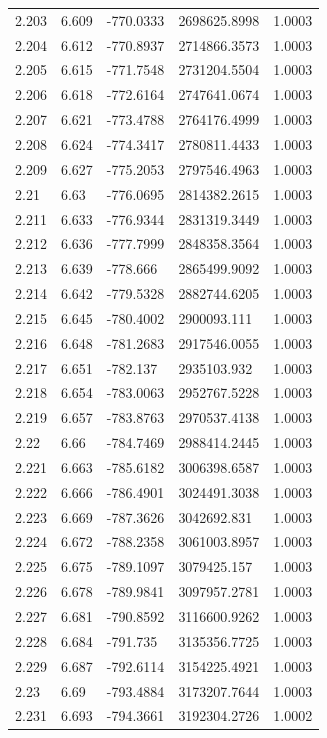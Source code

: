 \begin{tabular}{lllll}
2.203 & 6.609 & -770.0333 & 2698625.8998 & 1.0003 \\
2.204 & 6.612 & -770.8937 & 2714866.3573 & 1.0003 \\
2.205 & 6.615 & -771.7548 & 2731204.5504 & 1.0003 \\
2.206 & 6.618 & -772.6164 & 2747641.0674 & 1.0003 \\
2.207 & 6.621 & -773.4788 & 2764176.4999 & 1.0003 \\
2.208 & 6.624 & -774.3417 & 2780811.4433 & 1.0003 \\
2.209 & 6.627 & -775.2053 & 2797546.4963 & 1.0003 \\
2.21 & 6.63 & -776.0695 & 2814382.2615 & 1.0003 \\
2.211 & 6.633 & -776.9344 & 2831319.3449 & 1.0003 \\
2.212 & 6.636 & -777.7999 & 2848358.3564 & 1.0003 \\
2.213 & 6.639 & -778.666 & 2865499.9092 & 1.0003 \\
2.214 & 6.642 & -779.5328 & 2882744.6205 & 1.0003 \\
2.215 & 6.645 & -780.4002 & 2900093.111 & 1.0003 \\
2.216 & 6.648 & -781.2683 & 2917546.0055 & 1.0003 \\
2.217 & 6.651 & -782.137 & 2935103.932 & 1.0003 \\
2.218 & 6.654 & -783.0063 & 2952767.5228 & 1.0003 \\
2.219 & 6.657 & -783.8763 & 2970537.4138 & 1.0003 \\
2.22 & 6.66 & -784.7469 & 2988414.2445 & 1.0003 \\
2.221 & 6.663 & -785.6182 & 3006398.6587 & 1.0003 \\
2.222 & 6.666 & -786.4901 & 3024491.3038 & 1.0003 \\
2.223 & 6.669 & -787.3626 & 3042692.831 & 1.0003 \\
2.224 & 6.672 & -788.2358 & 3061003.8957 & 1.0003 \\
2.225 & 6.675 & -789.1097 & 3079425.157 & 1.0003 \\
2.226 & 6.678 & -789.9841 & 3097957.2781 & 1.0003 \\
2.227 & 6.681 & -790.8592 & 3116600.9262 & 1.0003 \\
2.228 & 6.684 & -791.735 & 3135356.7725 & 1.0003 \\
2.229 & 6.687 & -792.6114 & 3154225.4921 & 1.0003 \\
2.23 & 6.69 & -793.4884 & 3173207.7644 & 1.0003 \\
2.231 & 6.693 & -794.3661 & 3192304.2726 & 1.0002 \\

\end{tabular}
